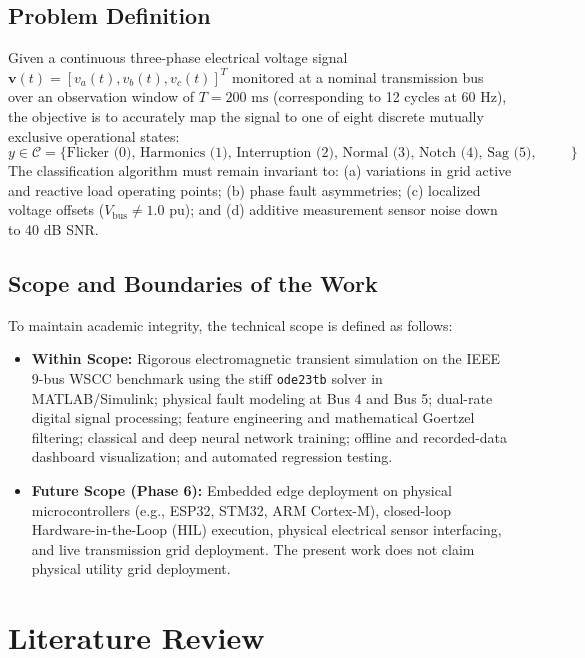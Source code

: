 \documentclass[12pt,a4paper]{report}
\begin{document}
\section{Problem Definition}
Given a continuous three-phase electrical voltage signal $\mathbf{v}(t) = [v_a(t), v_b(t), v_c(t)]^T$ monitored at a nominal transmission bus over an observation window of $T = 200\text{ ms}$ (corresponding to 12 cycles at $60\text{ Hz}$), the objective is to accurately map the signal to one of eight discrete mutually exclusive operational states:
\begin{equation}
y \in \mathcal{C} = \{\text{Flicker (0), Harmonics (1), Interruption (2), Normal (3), Notch (4), Sag (5), Swell (6), Transient (7)}\}
\end{equation}
The classification algorithm must remain invariant to:
(a) variations in grid active and reactive load operating points;
(b) phase fault asymmetries;
(c) localized voltage offsets ($V_{\text{bus}} \neq 1.0\text{ pu}$); and
(d) additive measurement sensor noise down to 40 dB SNR.

\section{Scope and Boundaries of the Work}
To maintain academic integrity, the technical scope is defined as follows:
\begin{itemize}
    \item \textbf{Within Scope:} Rigorous electromagnetic transient simulation on the IEEE 9-bus WSCC benchmark using the stiff \texttt{ode23tb} solver in MATLAB/Simulink; physical fault modeling at Bus 4 and Bus 5; dual-rate digital signal processing; feature engineering and mathematical Goertzel filtering; classical and deep neural network training; offline and recorded-data dashboard visualization; and automated regression testing.
    \item \textbf{Future Scope (Phase 6):} Embedded edge deployment on physical microcontrollers (e.g., ESP32, STM32, ARM Cortex-M), closed-loop Hardware-in-the-Loop (HIL) execution, physical electrical sensor interfacing, and live transmission grid deployment. The present work does not claim physical utility grid deployment.
\end{itemize}

\chapter{Literature Review}
\end{document}
